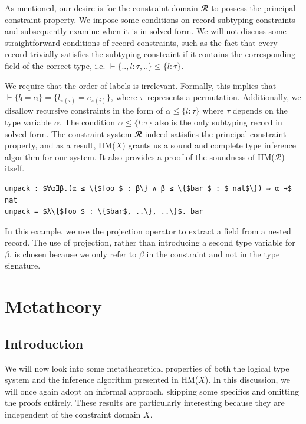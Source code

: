 \documentclass[runningheads]{llncs}
\newcommand{\hmx}{HM($X$)}
\newcommand{\hmr}{HM($ℛ$)}
\begin{document}
As mentioned, our desire is for the constraint domain $𝓡$ to possess the
principal constraint property. We impose some conditions on record
subtyping constraints and subsequently examine when it is in solved form. We
will not discuss some straightforward conditions of record constraints, such as
the fact that every record trivially satisfies the subtyping constraint if it
contains the corresponding field of the correct type, i.e.
$⊢ \{.., l:τ, ..\} ≤ \{l : τ\}$.

We require that the order of labels is irrelevant. Formally, this
implies that $⊢ \{lᵢ = eᵢ\} = \{l_{π(i)} = e_{π(i)}\}$, where $π$ represents a
permutation. Additionally, we disallow recursive constraints in the form of $α
  ≤ \{l : τ\}$ where $τ$ depends on the type variable $α$. The condition $α
  ≤ \{l : τ\}$ also is the only subtyping record in solved form.
The constraint system $𝓡$ indeed satisfies the principal constraint property,
and as a result, \hmx{} grants us a sound and complete type inference algorithm
for our system. It also provides a proof of the soundness of \hmr{} itself.

\begin{example}
  \begin{lstlisting}
unpack : $∀α∃β.(α ≤ \{$foo $ : β\} ∧ β ≤ \{$bar $ : $ nat$\}) ⇒ α →$ nat
unpack = $λ\{$foo $ : \{$bar$, ..\}, ..\}$. bar
  \end{lstlisting}
\end{example}
In this example, we use the projection operator to extract a field from a
nested record. The use of projection, rather than introducing a second type
variable for $β$, is chosen because we only refer to $β$ in the constraint and
not in the type signature.

\section{Metatheory}

\subsection{Introduction}
We will now look into some metatheoretical properties of both the logical type
system and the inference algorithm presented in \hmx{}.
In this discussion, we will once again adopt an informal approach, skipping
some specifics and omitting the proofs entirely. These results are
particularly
interesting because they are independent of the constraint domain $X$.
\end{document}
